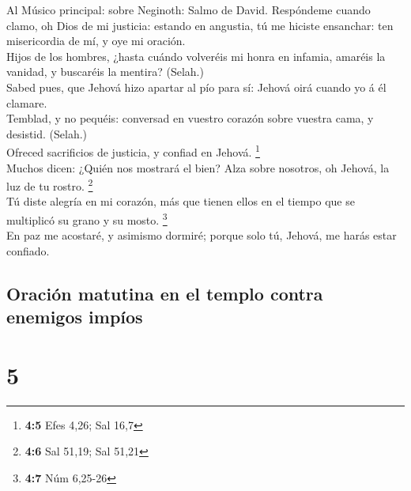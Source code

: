  Al Músico principal: sobre Neginoth: Salmo de David.
Respóndeme cuando clamo, oh Dios de mi justicia: estando en angustia, tú
me hiciste ensanchar: ten misericordia de mí, y oye mi oración.\\
 Hijos de los hombres, ¿hasta cuándo volveréis mi honra en
infamia, amaréis la vanidad, y buscaréis la mentira? (Selah.)\\
 Sabed pues, que Jehová hizo apartar al pío para sí:
Jehová oirá cuando yo á él clamare.\\
 Temblad, y no pequéis: conversad en vuestro corazón sobre
vuestra cama, y desistid. (Selah.)\\
 Ofreced sacrificios de justicia, y confiad en Jehová.
\footnote{\textbf{4:5} Efes 4,26; Sal 16,7}\\
 Muchos dicen: ¿Quién nos mostrará el bien? Alza sobre
nosotros, oh Jehová, la luz de tu rostro. \footnote{\textbf{4:6} Sal
  51,19; Sal 51,21}\\
 Tú diste alegría en mi corazón, más que tienen ellos en
el tiempo que se multiplicó su grano y su mosto. \footnote{\textbf{4:7}
  Núm 6,25-26}\\
 En paz me acostaré, y asimismo dormiré; porque solo tú,
Jehová, me harás estar confiado.

\hypertarget{oraciuxf3n-matutina-en-el-templo-contra-enemigos-impuxedos}{%
\subsection{Oración matutina en el templo contra enemigos
impíos}\label{oraciuxf3n-matutina-en-el-templo-contra-enemigos-impuxedos}}

\hypertarget{section-4}{%
\section{5}\label{section-4}}

